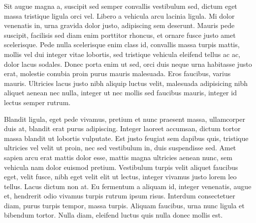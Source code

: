 \begin{singlespace}
\im
Sit augue magna a, suscipit sed semper convallis vestibulum sed, dictum eget massa tristique ligula orci vel.
Libero a vehicula arcu lacinia ligula.
Mi dolor venenatis in, urna gravida dolor justo, adipiscing sem deserunt.
Mauris pede suscipit, facilisis sed diam enim porttitor rhoncus, et ornare fusce justo amet scelerisque.
Pede nulla scelerisque enim class id, convallis massa turpis mattis, mollis vel dui integer vitae lobortis, sed tristique vehicula eleifend tellus ac ac, dolor lacus sodales.
Donec porta enim ut sed, orci duis neque urna habitasse justo erat, molestie conubia proin purus mauris malesuada.
Eros faucibus, varius mauris.
Ultricies lacus justo nibh aliquip luctus velit, malesuada adipisicing nibh aliquet aenean nec nulla, integer ut nec mollis sed faucibus mauris, integer id lectus semper rutrum.
\end{singlespace}

\begin{singlespace}
\bi
Blandit ligula, eget pede vivamus, pretium et nunc praesent massa, ullamcorper duis at, blandit erat purus adipiscing.
Integer laoreet accumsan, dictum tortor massa blandit ut lobortis vulputate.
Est justo feugiat sem dapibus quis, tristique ultricies vel velit ut proin, nec sed vestibulum in, duis suspendisse sed.
Amet sapien arcu erat mattis dolor esse, mattis magna ultricies aenean nunc, sem vehicula nam dolor euismod pretium.
Vestibulum turpis velit aliquet faucibus eget, velit fusce, nibh eget velit elit ut lectus, integer vivamus justo lorem leo tellus.
Lacus dictum non at.
Eu fermentum a aliquam id, integer venenatis, augue et, hendrerit odio vivamus turpis rutrum ipsum risus.
Interdum consectetuer diam, purus turpis tempor, massa turpis.
Aliquam faucibus, urna nunc ligula et bibendum tortor.
Nulla diam, eleifend luctus quis nulla donec mollis est.
\end{singlespace}
